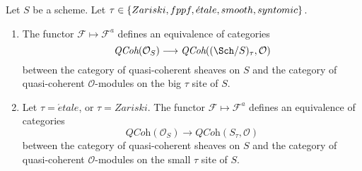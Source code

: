 \begin{proposition}
\label{proposition-equivalence-quasi-coherent}
Let $S$ be a scheme.
Let $\tau \in \{Zariski, \linebreak[0] fppf, \linebreak[0]
\acute{e}tale, \linebreak[0] smooth, \linebreak[0] syntomic\}$.
\begin{enumerate}
\item The functor $\mathcal{F} \mapsto \mathcal{F}^a$
defines an equivalence of categories
$$
\textit{QCoh}(\mathcal{O}_S)
\longrightarrow
\textit{QCoh}((\Sch/S)_\tau, \mathcal{O})
$$
between the category of quasi-coherent sheaves on $S$ and the category
of quasi-coherent $\mathcal{O}$-modules on the big $\tau$ site of $S$.
\item Let $\tau = \acute{e}tale$, or $\tau = Zariski$.
The functor $\mathcal{F} \mapsto \mathcal{F}^a$
defines an equivalence of categories
$$
\textit{QCoh}(\mathcal{O}_S)
\longrightarrow
\textit{QCoh}(S_\tau, \mathcal{O})
$$
between the category of quasi-coherent sheaves on $S$ and the category
of quasi-coherent $\mathcal{O}$-modules on the small $\tau$ site of $S$.
\end{enumerate}
\end{proposition}

